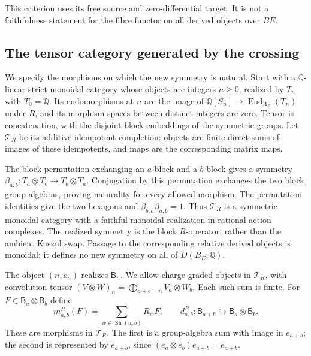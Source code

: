This criterion uses its free source and zero-differential target.
It is not a faithfulness statement for the fibre functor on all
derived objects over $BE$.

\subsection{The tensor category generated by the crossing}

We specify the morphisms on which the new symmetry is natural.
Start with a $\mathbb Q$-linear strict monoidal category whose
objects are integers $n\geq0$, realized by $T_n$ with $T_0=\mathbb Q$.
Its endomorphisms at $n$ are the image of
$\mathbb Q[S_n]\to\operatorname{End}_{\Lambda_E}(T_n)$ under $R$,
and its morphism spaces between distinct integers are zero.
Tensor is concatenation, with the disjoint-block embeddings of the
symmetric groups. Let $\mathcal T_R$ be its additive idempotent
completion: objects are finite direct sums of images of these
idempotents, and maps are the corresponding matrix maps.

The block permutation exchanging an $a$-block and a $b$-block gives
a symmetry
$\beta_{a,b}:T_a\otimes T_b\to T_b\otimes T_a$.
Conjugation by this permutation exchanges the two block group
algebras, proving naturality for every allowed morphism.
The permutation identities give the two hexagons and
$\beta_{b,a}\beta_{a,b}=1$.
Thus $\mathcal T_R$ is a symmetric monoidal category with a
faithful monoidal realization in rational action complexes.
The realized symmetry is the block $R$-operator, rather than the
ambient Koszul swap. Passage to the corresponding relative
derived objects is monoidal; it defines no new symmetry on all
of $D(B_E;\mathbb Q)$.

The object $(n,e_n)$ realizes $\mathsf B_n$.
We allow charge-graded objects in $\mathcal T_R$, with convolution
tensor
$(V\otimes W)_n=\bigoplus_{a+b=n}V_a\otimes W_b$.
Each such sum is finite. For $F\in\mathsf B_a\otimes\mathsf B_b$
define
\begin{equation}\label{gh:abstract-operations}
 m^R_{a,b}(F)=\sum_{w\in\operatorname{Sh}(a,b)}R_wF,\qquad
 d^R_{a,b}:\mathsf B_{a+b}\hookrightarrow
                           \mathsf B_a\otimes\mathsf B_b .
\end{equation}
These are morphisms in $\mathcal T_R$. The first is a group-algebra
sum with image in $e_{a+b}$; the second is represented by $e_{a+b}$,
since $(e_a\otimes e_b)e_{a+b}=e_{a+b}$.

